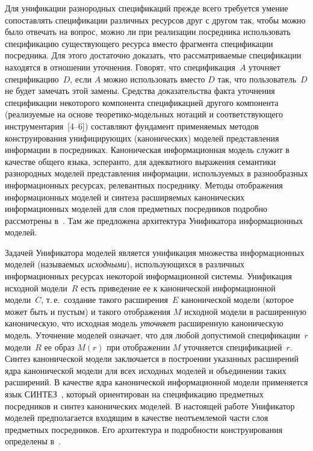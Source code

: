 \begin{multicols}{2}
Для унификации разнородных спецификаций прежде всего требуется умение
сопоставлять спецификации различных ресурсов друг с другом так, чтобы можно было
отвечать на вопрос, можно ли при реализации посредника использовать спецификацию
существующего ресурса вместо фрагмента спецификации посредника. Для этого
достаточно доказать, что рас\-смат\-ри\-ва\-е\-мые спецификации находятся в отношении
уточнения. Говорят, что спецификация~$A$ уточняет спецификацию~$D$, если $A$
можно использовать вместо $D$ так, что пользователь~$D$ не будет замечать этой
замены. Средст\-ва доказательства факта уточнения спецификации некоторого компонента
спецификацией другого компонента (реализуемые на основе теоретико-мо\-дель\-ных
нотаций и соответствующего инструментария~[4--6]) со\-став\-ля\-ют
фундамент применяемых методов конструирования унифицирующих (канонических)
моделей представления информации в посредниках. Каноническая информационная
модель служит в качестве общего языка, эсперанто, для адекватного выражения
семантики разнородных моделей пред\-став\-ле\-ния информации, используемых в
разнообразных информационных ресурсах, релевантных посреднику. Методы
отображения информационных моделей и синтеза расширяемых канонических
информационных моделей для слоя предметных посредников подробно рассмотрены
в~\cite{Зах07}. Там же предложена архитектура Унификатора информационных моделей.

Задачей Унификатора моделей является унификация множества информационных
моделей (называемых \textit{исходными}), использующихся в различных
информационных ресурсах некоторой информационной системы. Унификация исходной
модели~$R$ есть приведение ее к канонической информационной модели~$C$, т.\,е.\
создание такого расширения~$E$ канонической модели (которое может быть и пустым) и
такого отображения $M$ исходной модели в расширенную каноническую, что исходная
модель \textit{уточняет} расширенную каноническую модель. Уточнение моделей
означает, что для любой допустимой спецификации~$r$ модели~$R$ ее образ $M(r)$ при
отображении $M$ уточняется спецификацией~$r$. Синтез канонической модели
заключается в построении указанных расширений ядра канонической модели для всех
исходных моделей и объединении таких расширений. В качестве ядра канонической
информационной модели применяется язык СИНТЕЗ~\cite{KlaStu07}, который
ориентирован на спецификацию предметных посредников и синтез канонических
моделей. В настоящей работе %
Унифи\-ка\-тор моделей предполагается входящим в качестве
неотъемлемой части слоя предметных посредников. Его архитектура и подробности
конструирования определены в~\cite{Зах07}.


\end{multicols}

